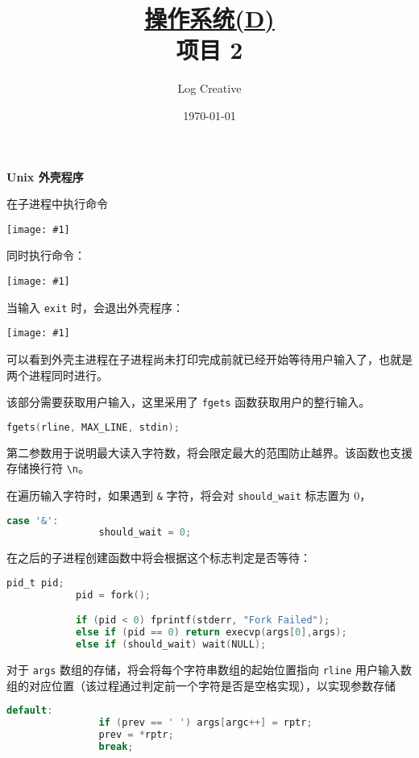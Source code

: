 \documentclass[12pt,a4paper]{article}
\newenvironment{problems}{\begin{list}{}{\renewcommand{\makelabel}[1]{\textbf{##1}\hfil}}}{\end{list}}
\newenvironment{steps}{\begin{list}{}{\renewcommand{\makelabel}[1]{##1.\hfil}}}{\end{list}}
\providecommand{\img}[1]{\texttt{[image: \#1]}}
\begin{document}
\title{\normalsize \underline{操作系统(D)}\\\LARGE 项目 2}
\author{Log Creative }
\date{\today}
\maketitle

\begin{problems}
    \item[一] \textbf{Unix 外壳程序}
    \begin{steps}
        
        \item[1] 在子进程中执行命令
        
        \img{ps.png}

        同时执行命令：

        \img{psc.png}

        当输入 \verb"exit" 时，会退出外壳程序：

        \img{exit.png}

        可以看到外壳主进程在子进程尚未打印完成前就已经开始等待用户输入了，也就是两个进程同时进行。

        该部分需要获取用户输入，这里采用了 \texttt{fgets} 函数获取用户的整行输入。
        \begin{lstlisting}[language=c]
            fgets(rline, MAX_LINE, stdin);
        \end{lstlisting}
        第二参数用于说明最大读入字符数，将会限定最大的范围防止越界。该函数也支援存储换行符 \verb"\n"。

        在遍历输入字符时，如果遇到 \verb"&" 字符，将会对 \verb"should_wait" 标志置为 0，
        \begin{lstlisting}[language=c]
            case '&':
                should_wait = 0;
        \end{lstlisting}
        在之后的子进程创建函数中将会根据这个标志判定是否等待：
        \begin{lstlisting}[language=c]
            pid_t pid;
            pid = fork();

            if (pid < 0) fprintf(stderr, "Fork Failed"); 
            else if (pid == 0) return execvp(args[0],args);
            else if (should_wait) wait(NULL);
        \end{lstlisting}

        对于 \verb"args" 数组的存储，将会将每个字符串数组的起始位置指向 \verb"rline" 用户输入数组的对应位置（该过程通过判定前一个字符是否是空格实现），以实现参数存储
        \begin{lstlisting}[language=c]
            default:
                if (prev == ' ') args[argc++] = rptr;
                prev = *rptr;
                break;
        \end{lstlisting}
        

\end{steps}
\end{problems}
\end{document}
